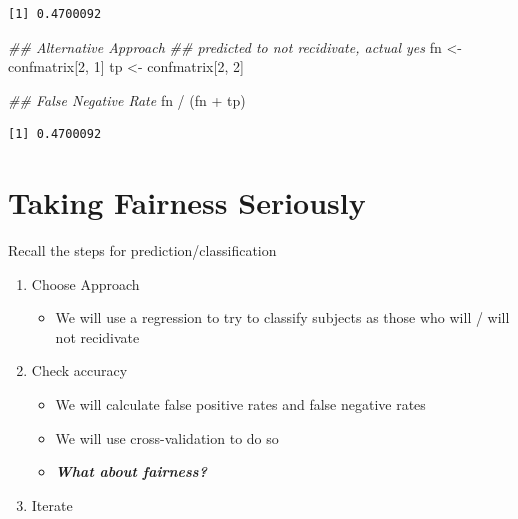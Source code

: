 \documentclass[
  letterpaper,
  DIV=11,
  numbers=noendperiod]{scrreprt}
\newenvironment{Shaded}{\begin{snugshade}}{\end{snugshade}}
\newcommand{\DecValTok}[1]{\textcolor[rgb]{0.68,0.00,0.00}{#1}}
\newcommand{\DocumentationTok}[1]{\textcolor[rgb]{0.37,0.37,0.37}{\textit{#1}}}
\newcommand{\NormalTok}[1]{\textcolor[rgb]{0.00,0.23,0.31}{#1}}
\newcommand{\OtherTok}[1]{\textcolor[rgb]{0.00,0.23,0.31}{#1}}
\newcommand{\SpecialCharTok}[1]{\textcolor[rgb]{0.37,0.37,0.37}{#1}}
\providecommand{\tightlist}{%
  \setlength{\itemsep}{0pt}\setlength{\parskip}{0pt}}\usepackage{longtable,booktabs,array}
\begin{document}
\begin{verbatim}
[1] 0.4700092
\end{verbatim}

\begin{Shaded}
\begin{Highlighting}[]
\DocumentationTok{\#\# Alternative Approach}
\DocumentationTok{\#\#  predicted to not recidivate, actual yes}
\NormalTok{fn }\OtherTok{\textless{}{-}}\NormalTok{ confmatrix[}\DecValTok{2}\NormalTok{, }\DecValTok{1}\NormalTok{]}
\NormalTok{tp }\OtherTok{\textless{}{-}}\NormalTok{ confmatrix[}\DecValTok{2}\NormalTok{, }\DecValTok{2}\NormalTok{]}

\DocumentationTok{\#\# False Negative Rate}
\NormalTok{fn }\SpecialCharTok{/}\NormalTok{ (fn }\SpecialCharTok{+}\NormalTok{ tp)}
\end{Highlighting}
\end{Shaded}

\begin{verbatim}
[1] 0.4700092
\end{verbatim}

\hypertarget{taking-fairness-seriously}{%
\section{Taking Fairness Seriously}\label{taking-fairness-seriously}}

Recall the steps for prediction/classification

\begin{enumerate}
\def\labelenumi{\arabic{enumi}.}
\tightlist
\item
  Choose Approach

  \begin{itemize}
  \tightlist
  \item
    We will use a regression to try to classify subjects as those who
    will / will not recidivate
  \end{itemize}
\item
  Check accuracy

  \begin{itemize}
  \tightlist
  \item
    We will calculate false positive rates and false negative rates
  \item
    We will use cross-validation to do so
  \item
    \textbf{\emph{What about fairness?}}
  \end{itemize}
\item
  Iterate
\end{enumerate}
\end{document}
